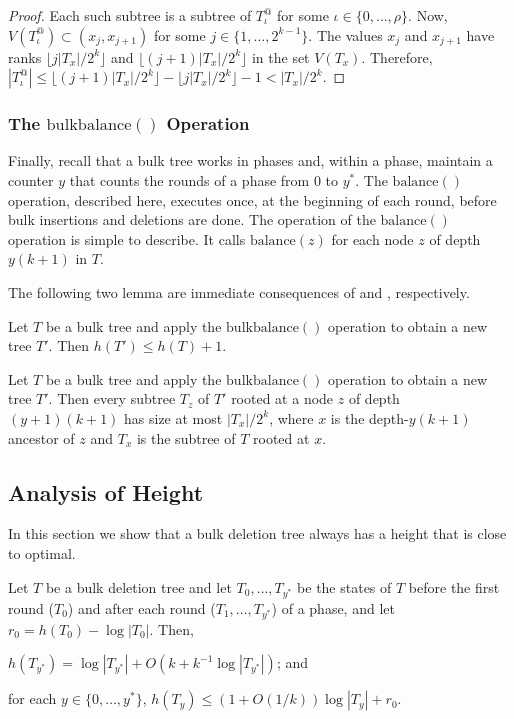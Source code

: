\documentclass[kpfonts]{patmorin}
\begin{document}
\begin{proof}
  Each such subtree is a subtree of $T^@_\iota$ for some $\iota\in\{0,\ldots,\rho\}$. Now, $V(T^@_\iota)\subset (x_j,x_{j+1})$ for some $j\in\{1,\ldots,2^{k-1}\}$.  The values $x_j$ and $x_{j+1}$ have ranks $\lfloor j|T_x|/2^k\rfloor$ and $\lfloor (j+1)|T_x|/2^k\rfloor$ in the set $V(T_x)$.  Therefore, $|T^@_\iota|\le \lfloor (j+1)|T_x|/2^k\rfloor- \lfloor j|T_x|/2^k\rfloor -1 < |T_x|/2^k$.
\end{proof}

\subsubsection{The $\mathrm{bulkbalance}()$ Operation}

Finally, recall that a bulk tree works in phases and, within a phase, maintain a counter $y$ that counts the rounds of a phase from $0$ to $y^*$.  The $\mathrm{balance}()$ operation, described here, executes once, at the beginning of each round, before bulk insertions and deletions are done.  The operation of the $\mathrm{balance}()$ operation is simple to describe.  It calls $\mathrm{balance}(z)$ for each node $z$ of depth $y(k+1)$ in $T$.

The following two lemma are immediate consequences of  and , respectively.

\begin{lem}
  Let $T$ be a bulk tree and apply the $\mathrm{bulkbalance}()$ operation to obtain a new tree $T'$.  Then $h(T')\le h(T)+1$.
\end{lem}

\begin{lem}
  Let $T$ be a bulk tree and apply the $\mathrm{bulkbalance}()$ operation to obtain a new tree $T'$.  Then every subtree $T_z$ of $T'$ rooted at a node $z$ of depth $(y+1)(k+1)$ has size at most $|T_x|/2^k$, where $x$ is the depth-$y(k+1)$ ancestor of $z$ and $T_x$ is the subtree of $T$ rooted at $x$.
\end{lem}


\subsection{Analysis of Height}

In this section we show that a bulk deletion tree always has a height that is close to optimal.

\begin{lem}
  Let $T$ be a bulk deletion tree and let $T_0,\ldots,T_{y^*}$ be the states of $T$ before the first round ($T_0$) and after each round ($T_1,\ldots,T_{y^*}$) of a phase, and let $r_0=h(T_0)-\log|T_0|$.  Then,
  \begin{compactenum}[(i)]
    \item $h(T_{y^*}) = \log|T_{y^*}|+O(k+k^{-1}\log|T_{y^*}|)$; and 
    \item for each $y\in\{0,\ldots,y^*\}$, $h(T_y)\le (1+O(1/k))\log|T_y| + r_0$.
  \end{compactenum}
\end{lem}
\end{document}
